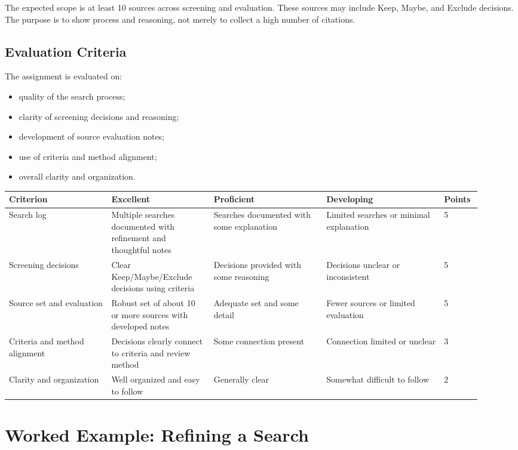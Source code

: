 \documentclass[11pt,letterpaper]{article}
\begin{document}
The expected scope is at least 10 sources across screening and evaluation. These sources may include Keep, Maybe, and Exclude decisions. The purpose is to show process and reasoning, not merely to collect a high number of citations.

\subsection{Evaluation Criteria}

The assignment is evaluated on:

\begin{itemize}
  \item quality of the search process;
  \item clarity of screening decisions and reasoning;
  \item development of source evaluation notes;
  \item use of criteria and method alignment;
  \item overall clarity and organization.
\end{itemize}

\begin{longtable}{@{}p{0.20\linewidth}p{0.20\linewidth}p{0.22\linewidth}p{0.23\linewidth}p{0.07\linewidth}@{}}
\toprule
\textbf{Criterion} & \textbf{Excellent} & \textbf{Proficient} & \textbf{Developing} & \textbf{Points}\\
\midrule
Search log & Multiple searches documented with refinement and thoughtful notes & Searches documented with some explanation & Limited searches or minimal explanation & 5\\
Screening decisions & Clear Keep/Maybe/Exclude decisions using criteria & Decisions provided with some reasoning & Decisions unclear or inconsistent & 5\\
Source set and evaluation & Robust set of about 10 or more sources with developed notes & Adequate set and some detail & Fewer sources or limited evaluation & 5\\
Criteria and method alignment & Decisions clearly connect to criteria and review method & Some connection present & Connection limited or unclear & 3\\
Clarity and organization & Well organized and easy to follow & Generally clear & Somewhat difficult to follow & 2\\
\bottomrule
\end{longtable}

\section{Worked Example: Refining a Search}
\end{document}
